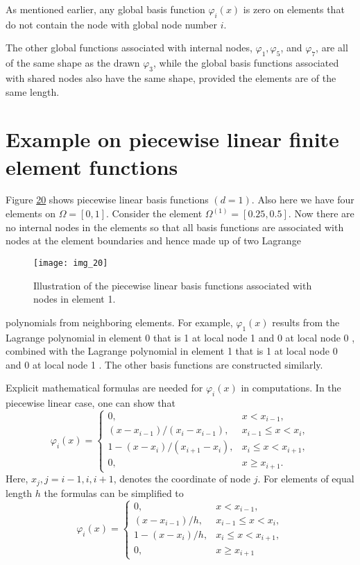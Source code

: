 \documentclass[../main.tex]{subfiles}
\begin{document}
	\noindent As mentioned earlier, any global basis function $\varphi_{i}(x)$ is zero on elements that do not contain the node with global node number $i$.
	
	The other global functions associated with internal nodes, $\varphi_{1}, \varphi_{5}$, and $\varphi_{7}$, are all of the same shape as the drawn $\varphi_{3}$, while the global basis functions associated with shared nodes also have the same shape, provided the elements are of the same length.
	
	\section[Example on piecewise linear finite element functions]{Example on piecewise linear finite element functions}
	\label{sec:sec_3_4}
	Figure \hyperref[fig:img_20]{20} shows piecewise linear basis functions $(d=1)$. Also here we have four elements on $\Omega=[0,1]$. Consider the element $\Omega^{(1)}=[0.25,0.5]$. Now there are no internal nodes in the elements so that all basis functions are associated with nodes at the element boundaries and hence made up of two Lagrange
	\begin{figure}[H]
		\centering
		\texttt{[image: img\_20]}
		\caption{Illustration of the piecewise linear basis functions associated with
			nodes in element 1.}
		\label{fig:img_20}
	\end{figure}
	
	\noindent polynomials from neighboring elements. For example, $\varphi_{1}(x)$ results from the Lagrange polynomial in element 0 that is 1 at local node 1 and 0 at local node 0 , combined with the Lagrange polynomial in element 1 that is 1 at local node 0 and 0 at local node 1 . The other basis functions are constructed similarly.
	
	Explicit mathematical formulas are needed for $\varphi_{i}(x)$ in computations. In the piecewise linear case, one can show that
	\begin{equation}\label{eqa53}
		\varphi_{i}(x)= \begin{cases}0, & x<x_{i-1}, \\ \left(x-x_{i-1}\right) /\left(x_{i}-x_{i-1}\right), & x_{i-1} \leq x<x_{i}, \\ 1-\left(x-x_{i}\right) /\left(x_{i+1}-x_{i}\right), & x_{i} \leq x<x_{i+1}, \\ 0, & x \geq x_{i+1}.\end{cases}
	\end{equation}
	Here, $x_{j}, j=i-1, i, i+1$, denotes the coordinate of node $j$. For elements of equal length $h$ the formulas can be simplified to
	\begin{equation}\label{eqa54}
		\varphi_{i}(x)= \begin{cases}0, & x<x_{i-1}, \\ \left(x-x_{i-1}\right) / h, & x_{i-1} \leq x<x_{i}, \\ 1-\left(x-x_{i}\right) / h, & x_{i} \leq x<x_{i+1}, \\ 0, & x \geq x_{i+1}\end{cases}
	\end{equation}
\end{document}
